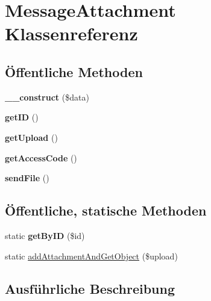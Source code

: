 \hypertarget{class_message_attachment}{}\section{Message\+Attachment Klassenreferenz}
\label{class_message_attachment}
\subsection*{Öffentliche Methoden}
\begin{DoxyCompactItemize}
\item 
\mbox{\label{class_message_attachment_a6815f8bb00f4c864e8d14da4915a6089}} 
{\bfseries \+\_\+\+\_\+construct} (\$data)
\item 
\mbox{\label{class_message_attachment_a00c502c45c02a7976da8f8e577550154}} 
{\bfseries get\+ID} ()
\item 
\mbox{\label{class_message_attachment_a10239921c11139962563d68ce9793cec}} 
{\bfseries get\+Upload} ()
\item 
\mbox{\label{class_message_attachment_a092468dfc95d217bc4f05fa090f06f58}} 
{\bfseries get\+Access\+Code} ()
\item 
\mbox{\label{class_message_attachment_a95d36ff3cfe87ad7955531a18f82be46}} 
{\bfseries send\+File} ()
\end{DoxyCompactItemize}
\subsection*{Öffentliche, statische Methoden}
\begin{DoxyCompactItemize}
\item 
\mbox{\label{class_message_attachment_ac32daab68b02ed868c5744de0b47db30}} 
static {\bfseries get\+By\+ID} (\$id)
\item 
static \mbox{\hyperlink{class_message_attachment_a06c241aad28a1032d91f2e75a3c8a1b4}{add\+Attachment\+And\+Get\+Object}} (\$upload)
\end{DoxyCompactItemize}


\subsection{Ausführliche Beschreibung}


